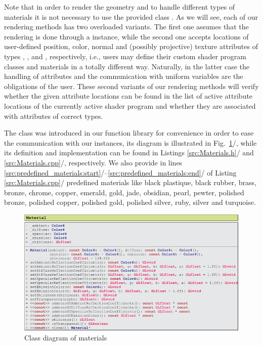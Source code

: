 \documentclass[b5paper, twosided]{book}
\newcommand{\CRed}[1]{{\color[rgb]{0.5, 0.0, 0.0}{#1}}}
\newcommand{\CBlue}[1]{{\color[rgb]{0.0, 0.0, 0.9}{#1}}}
\DeclareRobustCommand{\mref}[1]{\ref{#1}{\relsize{-1}/\pageref{#1}}}
\begin{document}

Note that in order to render the geometry and to handle different types of materials it is not necessary to use the provided class \CBlue{ShaderProgram}. As we will see, each of our rendering methods has two overloaded variants. The first one assumes that the rendering is done through a \CBlue{ShaderProgram} instance, while the second one accepts locations of user-defined position, color, normal and (possibly projective) texture attributes of types \CRed{vec3}, \CRed{vec4}, \CRed{vec3} and \CRed{vec4}, respectively, i.e., users may define their custom shader program classes and materials in a totally different way. Naturally, in the latter case the handling of attributes and the communication with uniform variables are the obligations of the user. These second variants of our rendering methods will verify whether the given attribute locations can be found in the list of active attribute locations of the currently active shader program and whether they are associated with attributes of correct types.

The class \CBlue{Material} was introduced in our function library for convenience in order to ease the communication with our \CBlue{ShaderProgram} instances, its diagram is illustrated in Fig.\ \mref{fig:UMLMaterial}, while its definition and implementation can be found in Listings \mref{src:Materials.h} and \mref{src:Materials.cpp}, respectively. We also provide in lines \mref{src:predefined_materials:start}--\mref{src:predefined_materials:end} of Listing \mref{src:Materials.cpp} predefined materials like black plastique, black rubber, brass, bronze, chrome, copper, emerald, gold, jade, obsidian, pearl, pewter, polished bronze, polished copper, polished gold, polished silver, ruby, silver and turquoise.

\begin{figure}[!h]
    \centering
    \includegraphics[]{images/UMLMaterial.pdf}
    \caption{Class diagram of materials}
    \label{fig:UMLMaterial}
\end{figure}
\end{document}
